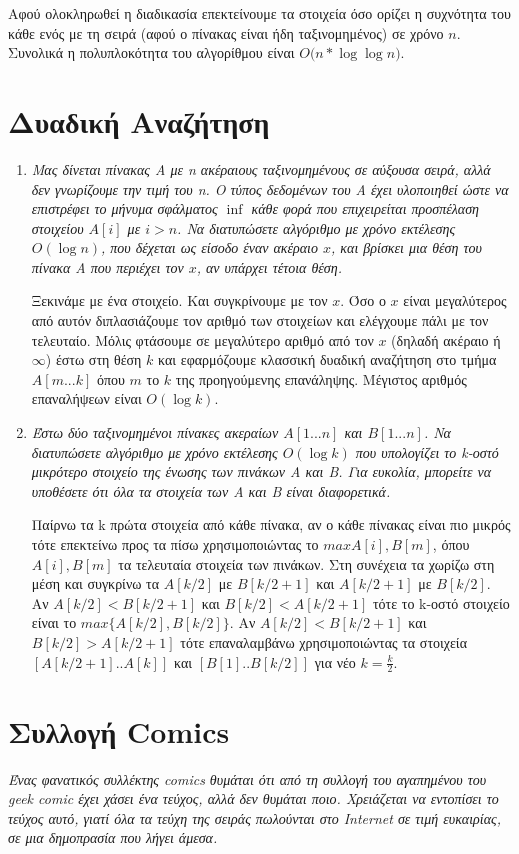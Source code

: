 \documentclass[a4paper,10pt]{article} \usepackage{anysize}
\begin{document}
Αφού ολοκληρωθεί η διαδικασία επεκτείνουμε τα στοιχεία όσο ορίζει η συχνότητα
του κάθε ενός με τη σειρά (αφού ο πίνακας είναι ήδη ταξινομημένος) σε χρόνο
$n$. Συνολικά η πολυπλοκότητα του αλγορίθμου είναι $O(n*\log{\log{n})}$.
\section{Δυαδική Αναζήτηση}
\begin{enumerate}
\item \textit{Μας δίνεται πίνακας Α με n ακέραιους ταξινομημένους σε αύξουσα
σειρά, αλλά \emph{δεν γνωρίζουμε την τιμή του n}. Ο τύπος δεδομένων του Α έχει
υλοποιηθεί ώστε να επιστρέφει το μήνυμα σφάλματος $\inf$ κάθε φορά που
επιχειρείται προσπέλαση στοιχείου $A[i]$ με $i > n$. Να διατυπώσετε αλγόριθμο
με χρόνο εκτέλεσης $O(\log{n})$, που δέχεται ως είσοδο έναν ακέραιο $x$, και
βρίσκει μια θέση του πίνακα Α που περιέχει τον $x$, αν υπάρχει τέτοια θέση.}

Ξεκινάμε με ένα στοιχείο. Και συγκρίνουμε με τον $x$. Όσο ο $x$ είναι
μεγαλύτερος από αυτόν διπλασιάζουμε τον αριθμό των στοιχείων και ελέγχουμε
πάλι με τον τελευταίο. Μόλις φτάσουμε σε μεγαλύτερο αριθμό από τον $x$
(δηλαδή ακέραιο ή $\infty$) έστω στη θέση $k$ και εφαρμόζουμε κλασσική δυαδική αναζήτηση στο τμήμα $A[m...k]$
όπου $m$ το $k$ της προηγούμενης επανάληψης. 
Μέγιστος αριθμός επαναλήψεων είναι $O(\log{k})$.
\item \textit{Έστω δύο ταξινομημένοι πίνακες ακεραίων $A[1...n]$ και
$B[1...n]$. Να διατυπώσετε αλγόριθμο με χρόνο εκτέλεσης $O(\log{k})$ που
υπολογίζει το k-οστό μικρότερο στοιχείο της ένωσης των πινάκων Α και Β. Για
ευκολία, μπορείτε να υποθέσετε ότι όλα τα στοιχεία των Α και Β είναι
διαφορετικά.}

Παίρνω τα k πρώτα στοιχεία από κάθε πίνακα, αν ο κάθε πίνακας είναι πιο μικρός
τότε επεκτείνω προς τα πίσω χρησιμοποιώντας το $max{A[i],B[m]}$, όπου
$A[i],B[m]$ τα τελευταία στοιχεία των πινάκων. Στη συνέχεια τα χωρίζω στη μέση και
συγκρίνω τα $A[k/2]$ με $B[k/2+1]$ και $A[k/2+1]$ με $B[k/2]$. Αν
$A[k/2]<B[k/2+1]$ και $B[k/2]<A[k/2+1]$ τότε το k-οστό στοιχείο είναι το
$max\{A[k/2],B[k/2]\}$. Αν $A[k/2]<B[k/2+1]$ και $B[k/2]>A[k/2+1]$ τότε
επαναλαμβάνω χρησιμοποιώντας τα στοιχεία $[A[k/2+1]..A[k]]$ και
$[B[1]..B[k/2]]$ για νέο $k=\frac{k}{2}$.
\end{enumerate}
\pagebreak
\section{Συλλογή Comics}
\textit{Ένας φανατικός συλλέκτης comics θυμάται ότι από τη συλλογή του
αγαπημένου του geek comic έχει χάσει ένα τεύχος, αλλά δεν θυμάται ποιο.
Χρειάζεται να εντοπίσει το τεύχος αυτό, γιατί όλα τα τεύχη της σειράς
πωλούνται στο Internet σε τιμή ευκαιρίας, σε μια δημοπρασία που λήγει άμεσα.}
\end{document}
